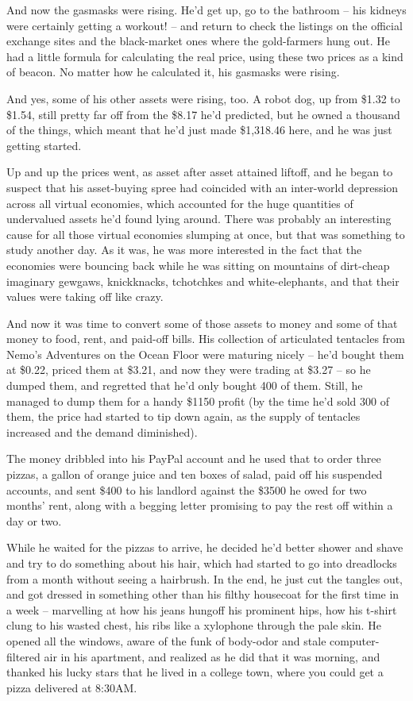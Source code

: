 And now the gasmasks were rising. He'd get up, go to the bathroom
-- his kidneys were certainly getting a workout! -- and return to
check the listings on the official exchange sites and the
black-market ones where the gold-farmers hung out. He had a little
formula for calculating the real price, using these two prices as a
kind of beacon. No matter how he calculated it, his gasmasks were
rising.

And yes, some of his other assets were rising, too. A robot dog, up
from \$1.32 to \$1.54, still pretty far off from the \$8.17 he'd
predicted, but he owned a thousand of the things, which meant that
he'd just made \$1,318.46 here, and he was just getting started.

Up and up the prices went, as asset after asset attained liftoff,
and he began to suspect that his asset-buying spree had coincided
with an inter-world depression across all virtual economies, which
accounted for the huge quantities of undervalued assets he'd found
lying around. There was probably an interesting cause for all those
virtual economies slumping at once, but that was something to study
another day. As it was, he was more interested in the fact that the
economies were bouncing back while he was sitting on mountains of
dirt-cheap imaginary gewgaws, knickknacks, tchotchkes and
white-elephants, and that their values were taking off like crazy.

And now it was time to convert some of those assets to money and
some of that money to food, rent, and paid-off bills. His
collection of articulated tentacles from Nemo's Adventures on the
Ocean Floor were maturing nicely -- he'd bought them at \$0.22,
priced them at \$3.21, and now they were trading at \$3.27 -- so he
dumped them, and regretted that he'd only bought 400 of them.
Still, he managed to dump them for a handy \$1150 profit (by the
time he'd sold 300 of them, the price had started to tip down
again, as the supply of tentacles increased and the demand
diminished).

The money dribbled into his PayPal account and he used that to
order three pizzas, a gallon of orange juice and ten boxes of
salad, paid off his suspended accounts, and sent \$400 to his
landlord against the \$3500 he owed for two months' rent, along
with a begging letter promising to pay the rest off within a day or
two.

While he waited for the pizzas to arrive, he decided he'd better
shower and shave and try to do something about his hair, which had
started to go into dreadlocks from a month without seeing a
hairbrush. In the end, he just cut the tangles out, and got dressed
in something other than his filthy housecoat for the first time in
a week -- marvelling at how his jeans hungoff his prominent hips,
how his t-shirt clung to his wasted chest, his ribs like a
xylophone through the pale skin. He opened all the windows, aware
of the funk of body-odor and stale computer-filtered air in his
apartment, and realized as he did that it was morning, and thanked
his lucky stars that he lived in a college town, where you could
get a pizza delivered at 8:30AM.

